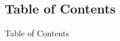 \subsection*{Table of Contents}
\begin{frame}{Table of Contents}
	\tableofcontents[hideallsubsections]
\end{frame}